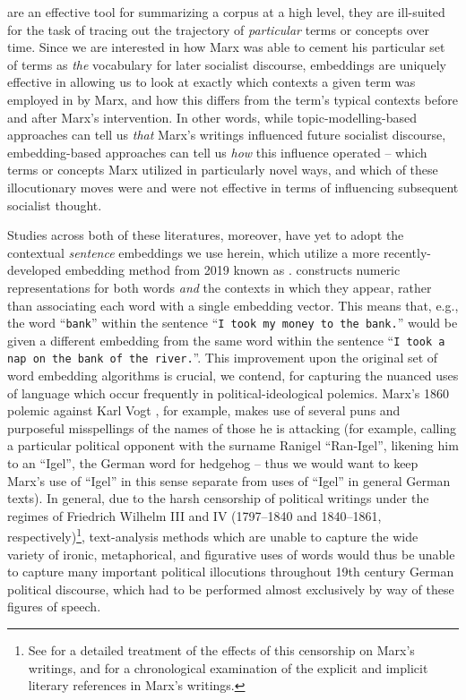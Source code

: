 are an effective tool for summarizing a corpus at a high level, they are ill-suited for the task of tracing out the trajectory of \textit{particular} terms or concepts over time. Since we are interested in how Marx was able to cement his particular set of terms as \textit{the} vocabulary for later socialist discourse, embeddings are uniquely effective in allowing us to look at exactly which contexts a given term was employed in by Marx, and how this differs from the term's typical contexts before and after Marx's intervention. In other words, while topic-modelling-based approaches can tell us \textit{that} Marx's writings influenced future socialist discourse, embedding-based approaches can tell us \textit{how} this influence operated -- which terms or concepts Marx utilized in particularly novel ways, and which of these illocutionary moves were and were not effective in terms of influencing subsequent socialist thought.

Studies across both of these literatures, moreover, have yet to adopt the contextual \textit{sentence} embeddings we use herein, which utilize a more recently-developed embedding method from 2019 known as \BERT{} \parencite{devlin_bert_2019}. \BERT{} constructs numeric representations for both words \textit{and} the contexts in which they appear, rather than associating each word with a single embedding vector. This means that, e.g., the word ``\texttt{bank}'' within the sentence ``\texttt{I took my money to the bank.}'' would be given a different embedding from the same word within the sentence ``\texttt{I took a nap on the bank of the river.}''. This improvement upon the original set of word embedding algorithms is crucial, we contend, for capturing the nuanced uses of language which occur frequently in political-ideological polemics. Marx's 1860 polemic against Karl Vogt \parencite{marx_herr_1860}, for example, makes use of several puns and purposeful misspellings of the names of those he is attacking (for example, calling a particular political opponent with the surname Ranigel ``Ran-Igel'', likening him to an ``Igel'', the German word for hedgehog -- thus we would want to keep Marx's use of ``Igel'' in this sense separate from uses of ``Igel'' in general German texts). In general, due to the harsh censorship of political writings under the regimes of Friedrich Wilhelm III and IV (1797--1840 and 1840--1861, respectively)\footnote{See \cite{rose_reading_1978} for a detailed treatment of the effects of this censorship on Marx's writings, and \cite{prawer_karl_1976} for a chronological examination of the explicit and implicit literary references in Marx's writings.}, text-analysis methods which are unable to capture the wide variety of ironic, metaphorical, and figurative uses of words would thus be unable to capture many important political illocutions throughout 19th century German political discourse, which had to be performed almost exclusively by way of these figures of speech.

